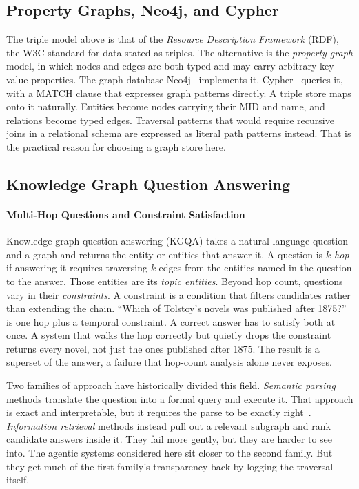 \subsection{Property Graphs, Neo4j, and Cypher}

The triple model above is that of the \emph{Resource Description Framework}
(RDF), the W3C standard for data stated as triples. The alternative is the
\emph{property graph} model, in which nodes and edges are
both typed and may carry arbitrary key--value properties. The graph database
Neo4j~\cite{robinson2015graph} implements it. Cypher~\cite{francis2018cypher}
queries it, with a \textsf{MATCH} clause that expresses graph patterns directly.
A triple store maps onto it naturally. Entities become nodes carrying their MID
and name, and relations become typed edges. Traversal patterns that would
require recursive joins in a relational schema are expressed as literal path
patterns instead. That is the practical reason for choosing a graph store here.

\subsection{Knowledge Graph Question Answering}\label{sec:kgqa}

\paragraph{Multi-Hop Questions and Constraint Satisfaction}

Knowledge graph question answering (KGQA) takes a
natural-language question and a graph and returns the
entity or entities that answer it. A question is \emph{$k$-hop} if answering it
requires traversing $k$ edges from the entities named in the question to the
answer. Those entities are its \emph{topic entities}. Beyond hop count,
questions vary in their \emph{constraints}. A constraint is a condition that
filters candidates rather than extending the chain. ``Which of Tolstoy's novels
was published after 1875?'' is one hop plus a temporal constraint. A correct
answer has to satisfy both at once. A system that walks the hop correctly but
quietly drops the constraint returns every novel, not just the ones published
after 1875. The result is a superset of the answer, a failure that hop-count
analysis alone never exposes.

Two families of approach have historically divided this field. \emph{Semantic
parsing} methods translate the question into a formal query and execute it. That
approach is exact and interpretable, but it requires the parse to be exactly
right~\cite{berant2013semantic,yih2016value}. \emph{Information retrieval}
methods instead pull out a relevant subgraph and rank candidate answers inside
it. They fail more gently, but they are harder to see into. The agentic systems
considered here sit closer to the second family. But they get much of the first
family's transparency back by logging the traversal itself.

